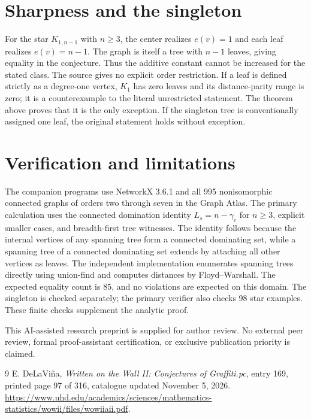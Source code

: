 \documentclass[11pt,a4paper]{article}
\begin{document}
\section{Sharpness and the singleton}
For the star $K_{1,n-1}$ with $n\ge3$, the center realizes $e(v)=1$ and each leaf realizes $e(v)=n-1$. The graph is itself a tree with $n-1$ leaves, giving equality in the conjecture. Thus the additive constant cannot be increased for the stated class.
The source gives no explicit order restriction. If a leaf is defined strictly as a degree-one vertex, $K_1$ has zero leaves and its distance-parity range is zero; it is a counterexample to the literal unrestricted statement. The theorem above proves that it is the only exception. If the singleton tree is conventionally assigned one leaf, the original statement holds without exception.
\section{Verification and limitations}
The companion programs use NetworkX 3.6.1 and all 995 nonisomorphic connected graphs of orders two through seven in the Graph Atlas. The primary calculation uses the connected domination identity $L_s=n-\gamma_c$ for $n\ge3$, explicit smaller cases, and breadth-first tree witnesses. The identity follows because the internal vertices of any spanning tree form a connected dominating set, while a spanning tree of a connected dominating set extends by attaching all other vertices as leaves. The independent implementation enumerates spanning trees directly using union-find and computes distances by Floyd--Warshall. The expected equality count is 85, and no violations are expected on this domain. The singleton is checked separately; the primary verifier also checks 98 star examples. These finite checks supplement the analytic proof.
 
This AI-assisted research preprint is supplied for author review. No external peer review, formal proof-assistant certification, or exclusive publication priority is claimed.
\begin{thebibliography}{9}
 E. DeLaVi\~na, \emph{Written on the Wall II: Conjectures of Graffiti.pc}, entry 169, printed page 97 of 316, catalogue updated November 5, 2026. \url{https://www.uhd.edu/academics/sciences/mathematics-statistics/wowii/files/wowiiaii.pdf}.
\end{thebibliography}
\end{document}
